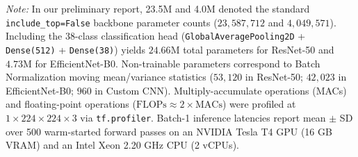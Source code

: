 \documentclass[journal]{IEEEtran}
\begin{document}
\begin{table}[!t]
\caption{Complete Architectural Specification, Parameter Breakdown, and Hardware Efficiency Profile ($224 \times 224 \times 3$ Input)}
\label{tab:arch_efficiency}
\centering
{}
\vspace{1.5mm}
\parbox{\textwidth}{\footnotesize \textit{Note:} In our preliminary report, 23.5M and 4.0M denoted the standard \texttt{include\_top=False} backbone parameter counts ($23,587,712$ and $4,049,571$). Including the 38-class classification head (\texttt{GlobalAveragePooling2D} + \texttt{Dense(512)} + \texttt{Dense(38)}) yields $24.66\text{M}$ total parameters for ResNet-50 and $4.73\text{M}$ for EfficientNet-B0. Non-trainable parameters correspond to Batch Normalization moving mean/variance statistics ($53,120$ in ResNet-50; $42,023$ in EfficientNet-B0; $960$ in Custom CNN). Multiply-accumulate operations (MACs) and floating-point operations ($\text{FLOPs} \approx 2 \times \text{MACs}$) were profiled at $1 \times 224 \times 224 \times 3$ via \texttt{tf.profiler}. Batch-1 inference latencies report mean $\pm$ SD over 500 warm-started forward passes on an NVIDIA Tesla T4 GPU (16 GB VRAM) and an Intel Xeon 2.20 GHz CPU (2 vCPUs).}
\end{table}
\end{document}
